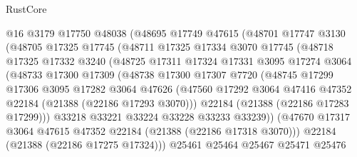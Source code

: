 \begin{lexlean}{RustCore}
\begin{coremodule}
                @16
                @3179
                @17750
                @48038
                (@48695
                  @17749
                  @47615
                  (@48701
                    @17747
                    @3130
                    (@48705
                      @17325
                      @17745
                      (@48711
                        @17325
                        @17334
                        @3070
                        @17745
                        (@48718
                          @17325
                          @17332
                          @3240
                          (@48725
                            @17311
                            @17324
                            @17331
                            @3095
                            @17274
                            @3064
                            (@48733
                              @17300
                              @17309
                              (@48738
                                @17300
                                @17307
                                @7720
                                (@48745
                                  @17299
                                  @17306
                                  @3095
                                  @17282
                                  @3064
                                  @47626
                                  (@47560
                                    @17292
                                    @3064
                                    @47416
                                    @47352
                                    @22184
                                    (@21388 (@22186 @17293 @3070)))
                                  @22184
                                  (@21388 (@22186 @17283 @17299)))
                                @33218
                                @33221
                                @33224
                                @33228
                                @33233
                                @33239))
                            (@47670
                              @17317
                              @3064
                              @47615
                              @47352
                              @22184
                              (@21388 (@22186 @17318 @3070)))
                            @22184
                            (@21388 (@22186 @17275 @17324)))
                          @25461
                          @25464
                          @25467
                          @25471
                          @25476

\end{coremodule}
\end{lexlean}
